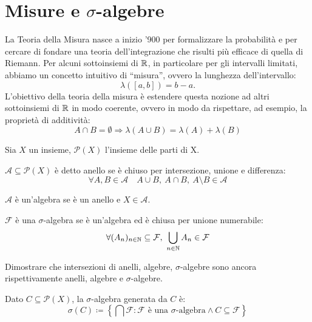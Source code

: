 %
%

\section{Misure e $ \sigma $-algebre}
La Teoria della Misura nasce a inizio '900 per formalizzare la probabilità e per cercare di fondare una teoria dell'integrazione che risulti più efficace di quella di Riemann. Per alcuni sottoinsiemi di $\mathbb{R}$, in particolare per gli intervalli limitati, abbiamo un concetto intuitivo di ``misura'', ovvero la lunghezza dell'intervallo:
\[ \lambda\left([a,b]\right) = b-a. \]
L'obiettivo della teoria della misura è estendere questa nozione ad altri sottoinsiemi di $\mathbb{R}$ in modo coerente, ovvero in modo da rispettare, ad esempio, la proprietà di additività:
\[ A \cap B = \emptyset \Rightarrow \lambda(A\cup B) = \lambda(A) + \lambda(B) \]

Sia $X$ un insieme, $\mathscr{P}(X)$ l'insieme delle parti di X.

\begin{definition}[anello]
	$\mathcal{A} \subseteq \mathscr{P}(X)$ è detto anello se è chiuso per intersezione, unione e differenza:
	\[ \forall A, B \in \mathcal A \quad A\cup B,\ A\cap B,\ A\setminus B \in \mathcal{A} \]
\end{definition}

\begin{definition}[algebra]
	$\mathcal{A}$ è un'algebra se è un anello e $X\in \mathcal{A}$.
\end{definition}

\begin{definition}
	$\mathcal{F} $ è una $\sigma$-algebra se è un'algebra ed è chiusa per unione numerabile:
	\[ \forall (A_n)_{n\in\N}\subseteq \mathcal{F},\ \bigcup_{n\in \N} A_n \in \mathcal{F} \]
\end{definition}

\begin{exercise}
	Dimostrare che intersezioni di anelli, algebre, $\sigma$-algebre sono ancora rispettivamente anelli, algebre e $\sigma$-algebre.
\end{exercise}

\begin{definition}
	Dato $C\subseteq \mathscr{P}(X)$, la $\sigma$-algebra generata da $C$ è:
	\[ \sigma(C) \coloneqq \left\{\bigcap \mathcal{F}: \mathcal{F} \text{ è una $\sigma$-algebra} \wedge C\subseteq \mathcal{F} \right\} \]
\end{definition}

